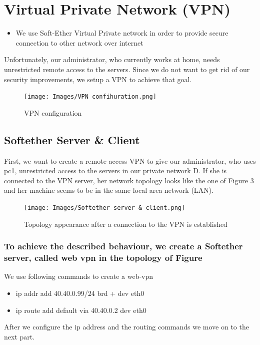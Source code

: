 \chapter{Virtual Private Network (VPN)}
\begin{itemize}
\item We use Soft-Ether Virtual Private network in order to provide secure connection to other network over internet
\end{itemize}
Unfortunately, our administrator, who currently works at home, needs unrestricted remote access to the servers. Since we do not want to get rid of our security improvements, we setup a VPN to achieve that goal.
\begin{figure}[H]
\centering
  \texttt{[image: Images/VPN confihuration.png]}
  \caption{VPN configuration}
  \label{fig }
\end{figure}
\section{Softether Server & Client}
First, we want to create a remote access VPN to give our administrator, who uses pc1, unrestricted access to the servers in our private network D. If she is connected to the VPN server, her network topology looks like the one of Figure 3 and her machine seems to be in the same local area network (LAN).
\begin{figure}[H]
\centering
  \texttt{[image: Images/Softether server \& client.png]}
  \caption{Topology appearance after a connection to the VPN is established}
  \label{fig }
\end{figure}

\subsection{To achieve the described behaviour, we create a Softether server, called web vpn in the topology of Figure}
We use following commands to create a web-vpn 
\begin{itemize}
\item ip addr add 40.40.0.99/24 brd + dev eth0
\item ip route add default via 40.40.0.2 dev eth0
\end{itemize}
After we configure the ip address and the routing commands we move on to the next part.
